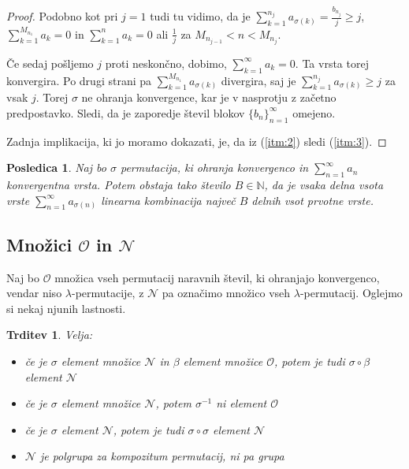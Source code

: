 \documentclass[12pt,a4paper,reqno]{amsart}
\theoremstyle{definition} %
\theoremstyle{plain} %
\newtheorem{trditev}[definicija]{Trditev}
\newtheorem{posledica}[definicija]{Posledica}
\newcommand{\Z}{\mathbb Z}
\begin{document}
\begin{proof}
Podobno kot pri $j=1$ tudi tu vidimo, da je $\sum_{k=1}^{n_j}a_{\sigma(k)}=\frac{b_{n_j}}{j}\geq j$, $\sum_{k=1}^{M_{n_1}}a_k=0$ in $\sum_{k=1}^{n}a_k=0$ ali $\frac{1}{j}$ za $M_{n_{j-1}}<n<M_{n_j}$.%

Če sedaj pošljemo $j$ proti neskončno, dobimo, $\sum_{k=1}^{\infty}a_k=0$. Ta vrsta torej konvergira. Po drugi strani pa $\sum_{k=1}^{M_{n_1}}a_{\sigma(k)}$ divergira, saj je $\sum_{k=1}^{n_j}a_{\sigma(k)}\geq j$ za vsak $j$. Torej $\sigma$ ne ohranja konvergence, kar je v nasprotju z začetno predpostavko. Sledi, da je zaporedje števil blokov $\{b_n\}^{\infty}_{n=1}$ omejeno.

Zadnja implikacija, ki jo moramo dokazati, je, da iz (\ref{itm:2}) sledi (\ref{itm:3}).


\end{proof}



\begin{posledica}
Naj bo $\sigma$ permutacija, ki ohranja konvergenco in $\sum^{\infty}_{n=1}a_n$ konvergentna vrsta. Potem obstaja tako število $B\in \mathbb{N}$, da je vsaka delna vsota vrste $\sum^{\infty}_{n=1}a_{\sigma(n)}$ linearna kombinacija največ $B$ delnih vsot prvotne vrste.
\end{posledica}

\subsection{Množici $\mathcal{O}$ in $\mathcal{N}$}

Naj bo $\mathcal{O}$ množica vseh permutacij naravnih števil, ki ohranjajo konvergenco, vendar niso $\lambda$-permutacije, z $\mathcal{N}$ pa označimo množico vseh $\lambda$-permutacij. Oglejmo si nekaj njunih lastnosti.

\begin{trditev}\label{trd:o in n}
Velja:
\begin{itemize}
\item če je $\sigma$ element množice $\mathcal{N}$  in $\beta$ element množice $\mathcal{O}$, potem je tudi $\sigma \circ \beta$ element $\mathcal{N}$
\item če je $\sigma$ element množice $\mathcal{N}$, potem $\sigma^{-1}$ ni element $\mathcal{O}$
\item če je $\sigma$ element $\mathcal{N}$, potem je tudi $\sigma \circ \sigma$ element $\mathcal{N}$
\item $\mathcal{N}$ je polgrupa za kompozitum permutacij, ni pa grupa
\end{itemize}
\end{trditev}
\end{document}

